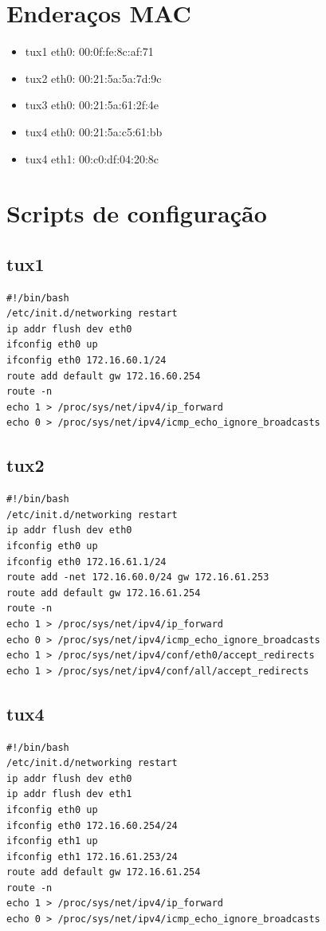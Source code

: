 \documentclass[11pt,a4paper,reqno]{report}
\numberwithin{equation}{section}
\begin{document}
\begin{appendices}

\chapter{Enderaços MAC}
\label{mac_addresses}
\begin{itemize} 
\item tux1 eth0: 00:0f:fe:8c:af:71
\item tux2 eth0: 00:21:5a:5a:7d:9c
\item tux3 eth0: 00:21:5a:61:2f:4e
\item tux4 eth0: 00:21:5a:c5:61:bb
\item tux4 eth1: 00:c0:df:04:20:8c
\end{itemize}

\chapter{Scripts de configuração}
\section{tux1}
\begin{verbatim}
#!/bin/bash
/etc/init.d/networking restart
ip addr flush dev eth0
ifconfig eth0 up
ifconfig eth0 172.16.60.1/24
route add default gw 172.16.60.254
route -n
echo 1 > /proc/sys/net/ipv4/ip_forward
echo 0 > /proc/sys/net/ipv4/icmp_echo_ignore_broadcasts
\end{verbatim}
\section{tux2}
\begin{verbatim}
#!/bin/bash
/etc/init.d/networking restart
ip addr flush dev eth0
ifconfig eth0 up
ifconfig eth0 172.16.61.1/24
route add -net 172.16.60.0/24 gw 172.16.61.253
route add default gw 172.16.61.254
route -n
echo 1 > /proc/sys/net/ipv4/ip_forward
echo 0 > /proc/sys/net/ipv4/icmp_echo_ignore_broadcasts
echo 1 > /proc/sys/net/ipv4/conf/eth0/accept_redirects
echo 1 > /proc/sys/net/ipv4/conf/all/accept_redirects
\end{verbatim}
\section{tux4}
\begin{verbatim}
#!/bin/bash
/etc/init.d/networking restart
ip addr flush dev eth0
ip addr flush dev eth1
ifconfig eth0 up
ifconfig eth0 172.16.60.254/24
ifconfig eth1 up
ifconfig eth1 172.16.61.253/24
route add default gw 172.16.61.254
route -n
echo 1 > /proc/sys/net/ipv4/ip_forward
echo 0 > /proc/sys/net/ipv4/icmp_echo_ignore_broadcasts
\end{verbatim}

\end{appendices}
\end{document}
